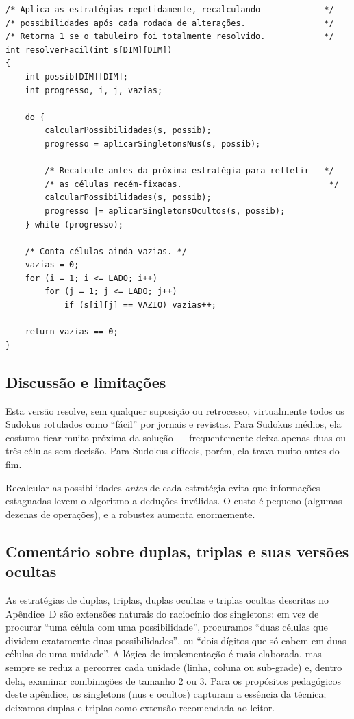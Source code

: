 \documentclass[11pt,a4paper,oneside]{report}
\begin{document}
\begin{lstlisting}[caption={Solucionador completo para Sudokus fáceis.},label={lst:solver_facil}]
/* Aplica as estratégias repetidamente, recalculando             */
/* possibilidades após cada rodada de alterações.                */
/* Retorna 1 se o tabuleiro foi totalmente resolvido.            */
int resolverFacil(int s[DIM][DIM])
{
    int possib[DIM][DIM];
    int progresso, i, j, vazias;

    do {
        calcularPossibilidades(s, possib);
        progresso = aplicarSingletonsNus(s, possib);

        /* Recalcule antes da próxima estratégia para refletir   */
        /* as células recém-fixadas.                              */
        calcularPossibilidades(s, possib);
        progresso |= aplicarSingletonsOcultos(s, possib);
    } while (progresso);

    /* Conta células ainda vazias. */
    vazias = 0;
    for (i = 1; i <= LADO; i++)
        for (j = 1; j <= LADO; j++)
            if (s[i][j] == VAZIO) vazias++;

    return vazias == 0;
}
\end{lstlisting}

\subsection{Discussão e limitações}

Esta versão resolve, sem qualquer suposição ou retrocesso, virtualmente
todos os Sudokus rotulados como ``fácil'' por jornais e revistas. Para
Sudokus médios, ela costuma ficar muito próxima da solução --- frequentemente
deixa apenas duas ou três células sem decisão. Para Sudokus difíceis,
porém, ela trava muito antes do fim.

\begin{boapratica}
Recalcular as possibilidades \emph{antes} de cada estratégia evita que
informações estagnadas levem o algoritmo a deduções inválidas. O custo é
pequeno (algumas dezenas de operações), e a robustez aumenta enormemente.
\end{boapratica}

\subsection{Comentário sobre duplas, triplas e suas versões ocultas}

As estratégias de duplas, triplas, duplas ocultas e triplas ocultas
descritas no Apêndice~D são extensões naturais do raciocínio dos
singletons: em vez de procurar ``uma célula com uma possibilidade'',
procuramos ``duas células que dividem exatamente duas possibilidades'',
ou ``dois dígitos que só cabem em duas células de uma unidade''. A lógica
de implementação é mais elaborada, mas sempre se reduz a percorrer cada
unidade (linha, coluna ou sub-grade) e, dentro dela, examinar combinações
de tamanho $2$ ou $3$. Para os propósitos pedagógicos deste apêndice, os
singletons (nus e ocultos) capturam a essência da técnica; deixamos
duplas e triplas como extensão recomendada ao leitor.
\end{document}
